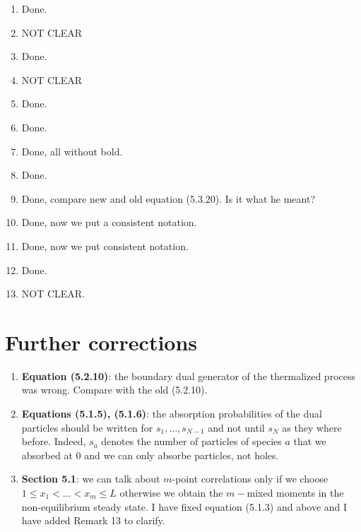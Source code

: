 \documentclass[10pt]{article}
\numberwithin{equation}{section}
\numberwithin{equation}{subsection}
\begin{document}
\begin{enumerate}
			\item Done.
			\item NOT CLEAR
			\item Done.
			\item NOT CLEAR
			\item Done.
			\item Done.
			\item Done, all without bold.
			\item Done.
			\item Done, compare new and old equation (5.3.20). Is it what he meant?
			\item Done, now we put a consistent notation.
			\item Done, now we put consistent notation.
			\item Done.
			\item NOT CLEAR.
		\end{enumerate}
\section*{Further corrections}
\begin{enumerate}
\item \textbf{Equation (5.2.10)}: the boundary dual generator of the thermalized process was wrong. Compare with the old (5.2.10). 
\item \textbf{Equations (5.1.5), (5.1.6)}: the absorption probabilities of the dual particles should be written for $s_{1},\ldots,s_{N-1}$ and not until $s_{N}$ as they where before. Indeed, $s_{a}$ denotes the number of particles of species $a$ that we absorbed at $0$ and we can only absorbe particles, not holes. 
\item \textbf{Section 5.1}: we can talk about $m$-point correlations only if we choose $1\leq x_{1}<\ldots<x_{m}\leq L$ otherwise  we obtain the $m-$mixed moments in the non-equilibrium steady state. I have fixed equation (5.1.3) and above and I have added Remark 13 to clarify.
\end{enumerate}
	
\end{document}
